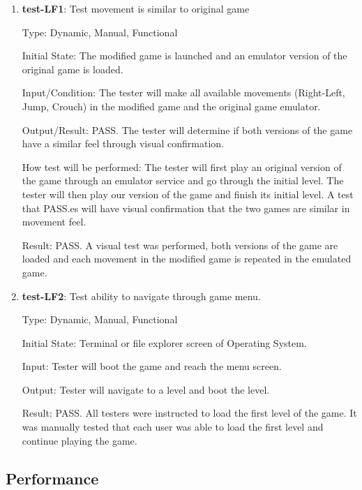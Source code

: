 \documentclass[12pt, titlepage]{article}
\begin{document}
\begin{enumerate}

\item{\textbf{test-LF1}: Test movement is similar to original game\\}

Type: Dynamic, Manual, Functional
					
Initial State: The modified game is launched and an emulator version of the original game is loaded.
					
Input/Condition: The tester will make all available movements (Right-Left, Jump, Crouch) in the modified game and the original game emulator.
					
Output/Result: PASS. The tester will determine if both versions of the game have a similar feel through visual confirmation.
					
How test will be performed: The tester will first play an original version of the game through an emulator service and go through the initial level. The tester will then play our version of the game and finish its initial level. A test that PASS.es will have visual confirmation that the two games are similar in movement feel.

Result: PASS. A visual test was performed, both versions of the game are loaded and each movement in the modified game is repeated in the emulated game. 

\item{\textbf{test-LF2}: Test ability to navigate through game menu.\\}

Type: Dynamic, Manual, Functional
					
Initial State: Terminal or file explorer screen of Operating System.
					
Input: Tester will boot the game and reach the menu screen.
					
Output: Tester will navigate to a level and boot the level.

Result: PASS. All testers were instructed to load the first level of the game. It was manually tested that each user was able to load the first level and continue playing the game.
		
\end{enumerate}		

\subsection{Performance}
\end{document}
